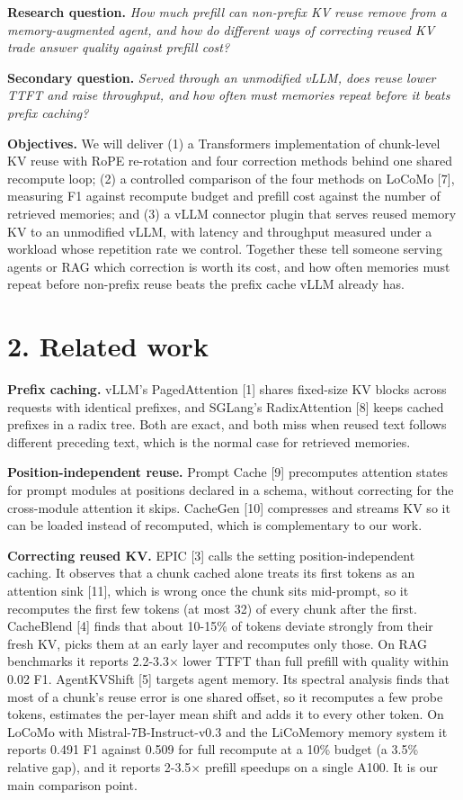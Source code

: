 \documentclass[
  10pt,
]{article}
\begin{document}
\textbf{Research question.} \emph{How much prefill can non-prefix KV
reuse remove from a memory-augmented agent, and how do different ways of
correcting reused KV trade answer quality against prefill cost?}

\textbf{Secondary question.} \emph{Served through an unmodified vLLM,
does reuse lower TTFT and raise throughput, and how often must memories
repeat before it beats prefix caching?}

\textbf{Objectives.} We will deliver (1) a Transformers implementation
of chunk-level KV reuse with RoPE re-rotation and four correction
methods behind one shared recompute loop; (2) a controlled comparison of
the four methods on LoCoMo {[}7{]}, measuring F1 against recompute
budget and prefill cost against the number of retrieved memories; and
(3) a vLLM connector plugin that serves reused memory KV to an
unmodified vLLM, with latency and throughput measured under a workload
whose repetition rate we control. Together these tell someone serving
agents or RAG which correction is worth its cost, and how often memories
must repeat before non-prefix reuse beats the prefix cache vLLM already
has.

\section{2. Related work}\label{related-work}

\textbf{Prefix caching.} vLLM's PagedAttention {[}1{]} shares fixed-size
KV blocks across requests with identical prefixes, and SGLang's
RadixAttention {[}8{]} keeps cached prefixes in a radix tree. Both are
exact, and both miss when reused text follows different preceding text,
which is the normal case for retrieved memories.

\textbf{Position-independent reuse.} Prompt Cache {[}9{]} precomputes
attention states for prompt modules at positions declared in a schema,
without correcting for the cross-module attention it skips. CacheGen
{[}10{]} compresses and streams KV so it can be loaded instead of
recomputed, which is complementary to our work.

\textbf{Correcting reused KV.} EPIC {[}3{]} calls the setting
position-independent caching. It observes that a chunk cached alone
treats its first tokens as an attention sink {[}11{]}, which is wrong
once the chunk sits mid-prompt, so it recomputes the first few tokens
(at most 32) of every chunk after the first. CacheBlend {[}4{]} finds
that about 10-15\% of tokens deviate strongly from their fresh KV, picks
them at an early layer and recomputes only those. On RAG benchmarks it
reports 2.2-3.3× lower TTFT than full prefill with quality within 0.02
F1. AgentKVShift {[}5{]} targets agent memory. Its spectral analysis
finds that most of a chunk's reuse error is one shared offset, so it
recomputes a few probe tokens, estimates the per-layer mean shift and
adds it to every other token. On LoCoMo with Mistral-7B-Instruct-v0.3
and the LiCoMemory memory system it reports 0.491 F1 against 0.509 for
full recompute at a 10\% budget (a 3.5\% relative gap), and it reports
2-3.5× prefill speedups on a single A100. It is our main comparison
point.
\end{document}
